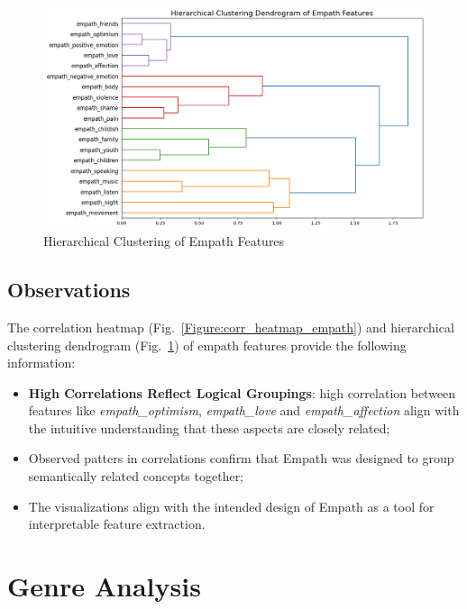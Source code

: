 \begin{center}
\begin{figure}[H]
  \centering
  \includegraphics[width=6in]{img/dendrogram_empath.png}
  \caption{Hierarchical Clustering of Empath Features}
  \label{Figure:dendrogram_empath}
\end{figure}
\end{center}


\subsection*{Observations}
The correlation heatmap (Fig.~\ref{Figure:corr_heatmap_empath}) and 
hierarchical clustering dendrogram (Fig.~\ref{Figure:dendrogram_empath}) of
empath features provide the following information:
\begin{itemize}
  \item \textbf{High Correlations Reflect Logical Groupings}: high correlation
    between features like \textit{empath\_optimism}, \textit{empath\_love} and
    \textit{empath\_affection} align with the intuitive understanding that
    these aspects are closely related;
  \item Observed patters in correlations confirm that Empath was designed to
    group semantically related concepts together;
  \item The visualizations align with the intended design of Empath as a tool
    for interpretable feature extraction.
\end{itemize}



\section{Genre Analysis}

